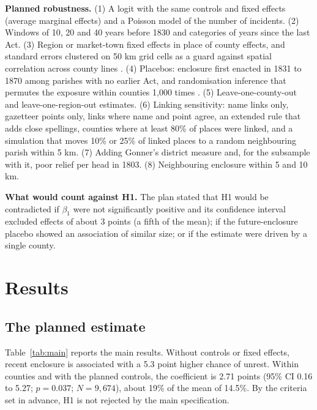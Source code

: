 \documentclass[11pt,a4paper]{article}
\begin{document}
\textbf{Planned robustness.} (1) A logit with the same controls and fixed effects (average marginal effects) and a Poisson model of the number of incidents. (2) Windows of 10, 20 and 40 years before 1830 and categories of years since the last Act. (3) Region or market-town fixed effects in place of county effects, and standard errors clustered on 50 km grid cells as a guard against spatial correlation across county lines \citep{conley1999}. (4) Placebos: enclosure first enacted in 1831 to 1870 among parishes with no earlier Act, and randomisation inference that permutes the exposure within counties 1,000 times \citep{young2019}. (5) Leave-one-county-out and leave-one-region-out estimates. (6) Linking sensitivity: name links only, gazetteer points only, links where name and point agree, an extended rule that adds close spellings, counties where at least 80\% of places were linked, and a simulation that moves 10\% or 25\% of linked places to a random neighbouring parish within 5 km. (7) Adding Gonner's district measure and, for the subsample with it, poor relief per head in 1803. (8) Neighbouring enclosure within 5 and 10 km.

\textbf{What would count against H1.} The plan stated that H1 would be contradicted if $\beta_1$ were not significantly positive and its confidence interval excluded effects of about 3 points (a fifth of the mean); if the future-enclosure placebo showed an association of similar size; or if the estimate were driven by a single county.

\section{Results}
\subsection{The planned estimate}
Table~\ref{tab:main} reports the main results. Without controls or fixed effects, recent enclosure is associated with a 5.3 point higher chance of unrest. Within counties and with the planned controls, the coefficient is 2.71 points (95\% CI 0.16 to 5.27; $p=0.037$; $N=9,674$), about 19\% of the mean of 14.5\%. By the criteria set in advance, H1 is not rejected by the main specification.
\end{document}

